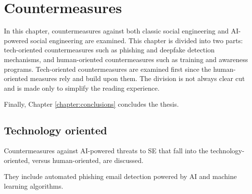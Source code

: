 



\chapter{Countermeasures\label{chapter:countermeasures}}

\begin{comment}


\end{comment}

In this chapter, countermeasures against both classic social engineering and AI-powered social engineering are examined. This chapter is divided into two parts: tech-oriented countermeasures such as phishing and deepfake detection mechanisms, and human-oriented countermeasures such as training and awareness programs. Tech-oriented countermeasures are examined first since the human-oriented measures rely and build upon them. The division is not always clear cut and is made only to simplify the reading experience.

Finally, Chapter \ref{chapter:conclusions} concludes the thesis.


\section{Technology oriented}

\begin{comment}    


\end{comment}



Countermeasures against AI-powered threats to SE that fall into the technology-oriented, versus human-oriented, are discussed.

They include automated phishing email detection powered by AI and machine learning algorithms.

